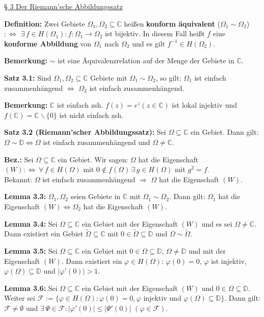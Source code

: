 \documentclass[11pt]{article}
\newcommand{\C}{\mathbb{C}}
\newcommand{\D}{\mathbb{D}}
\begin{document}
\underline{§ 3 Der Riemann'sche Abbildungssatz}

\textbf{Definition:} Zwei Gebiete $\Omega_1, \Omega_2 \subseteq \C$ heißen \textbf{konform äquivalent} ($\Omega_1 \sim \Omega_2$) $:\Leftrightarrow$ $\exists \, f \in H(\Omega_1) \colon f \colon \Omega_1 \to \Omega_2$ ist bijektiv. In diesem Fall heißt $f$ eine \textbf{konforme Abbildung} von $\Omega_1$ nach $\Omega_2$ und es gilt $f^{-1} \in H(\Omega_2)$.

\textbf{Bemerkung:} $\sim$ ist eine Äquivalenzrelation auf der Menge der Gebiete in $\C$.

\textbf{Satz 3.1:} Sind $\Omega_1, \Omega_2 \subseteq \C$ Gebiete mit $\Omega_1 \sim \Omega_2$, so gilt: $\Omega_1$ ist einfach zusammenhängend $\Leftrightarrow$ $\Omega_2$ ist einfach zusammenhängend. 

\textbf{Bemerkung:} $\C$ ist einfach zsh. $f(z) = e^z (z \in \C)$ ist lokal injektiv und $f(\C) = \C \backslash \{0\}$ ist nicht einfach zsh. 

\textbf{Satz 3.2 (Riemann'scher Abbildungssatz):} Sei $\Omega \subseteq \C$ ein Gebiet. Dann gilt: $\Omega \sim \D \Leftrightarrow \Omega$ ist einfach zusammenhängend und $\Omega \neq \C$.

\textbf{Bez.:} Sei $\Omega \subseteq \C$ ein Gebiet. Wir sagen: $\Omega$ hat die Eigenschaft $(W) :\Leftrightarrow \, \forall \, f \in H(\Omega)$ mit $0 \notin f(\Omega) \, \exists \, g \in H(\Omega)$ mit $g^2 = f$. \\
Bekannt: $\Omega$ ist einfach zusammenhängend $\Rightarrow$ $\Omega$ hat die Eigenschaft $(W)$.

\textbf{Lemma 3.3:} $\Omega_1, \Omega_2$ seien Gebiete in $\C$ mit $\Omega_1 \sim \Omega_2$. Dann gilt: $\Omega_1$ hat die Eigenschaft $(W) \Leftrightarrow \Omega_2$ hat die Eigenschaft $(W)$.

\textbf{Lemma 3.4:} Sei $\Omega \subseteq \C$ ein Gebiet mit der Eigenschaft $(W)$ und es sei $\Omega \neq \C$. Dann existiert ein Gebiet $\tilde{\Omega} \subseteq \C$ mit $0 \in \tilde{\Omega} \subseteq \D$ und $\Omega \sim \tilde{\Omega}$.

\textbf{Lemma 3.5:} Sei $\Omega \subseteq \C$ ein Gebiet mit $0 \in \Omega \subseteq \D$, $\Omega \neq \D$ und mit der Eigenschaft $(W)$. Dann existiert ein $\varphi \in H(\Omega)$: $\varphi(0) = 0$, $\varphi$ ist injektiv, $\varphi(\Omega) \subseteq \D$ und $|\varphi'(0)| > 1$.

\textbf{Lemma 3.6:} Sei $\Omega \subseteq \C$ ein Gebiet mit der Eigenschaft $(W)$ und $0 \in \Omega \subseteq \D$. Weiter sei $\mathcal{F} := \{ \varphi \in H(\Omega)\colon \varphi(0) = 0, \varphi \text{ injektiv und } \varphi(\Omega) \subseteq \D \}$. Dann gilt: $\mathcal{F} \neq \emptyset$ und $\exists \, \Psi \in \mathcal{F} \colon |\varphi'(0)| \leq |\Psi'(0)|$ $(\varphi \in \mathcal{F})$.
\end{document}
